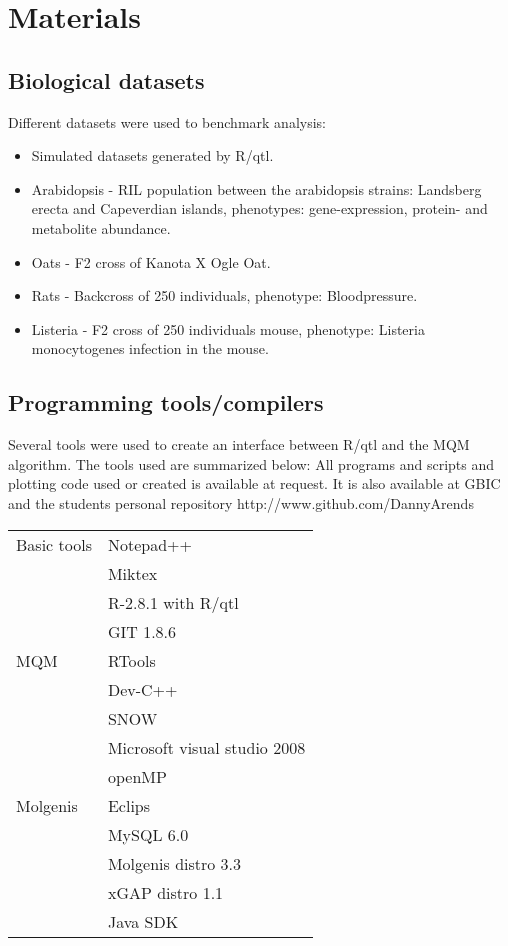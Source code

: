 \newpage
\section{Materials}
\subsection{Biological datasets}
Different datasets were used to benchmark analysis:
\begin{itemize}
\item	Simulated datasets generated by R/qtl. \cite{broman03}
\item	Arabidopsis - RIL population between the arabidopsis strains: Landsberg erecta and Capeverdian islands, phenotypes: gene-expression, protein- and metabolite abundance. \cite{keurtj}
\item	Oats - F2 cross of Kanota X Ogle Oat. \cite{Oats}
\item	Rats - Backcross of 250 individuals, phenotype: Bloodpressure. \cite{Hyper}
\item	Listeria - F2 cross of 250 individuals mouse, phenotype: Listeria monocytogenes infection in the mouse. \cite{Listeria}
\end{itemize}
\subsection{Programming tools/compilers}
Several tools were used to create an interface between R/qtl and the MQM algorithm. The tools used are summarized below:
All programs and scripts and plotting code used or created is available at request. It is also available at GBIC and the students personal repository http://www.github.com/DannyArends
\begin{table}[ht]
	\begin{tabular}{l  l}
Basic tools & Notepad++\\
	& Miktex\\
	& R-2.8.1 with R/qtl\\
	& GIT 1.8.6\\
MQM & RTools\\
	& Dev-C++\\
	& SNOW\\
	& Microsoft visual studio 2008\\
	& openMP\\
Molgenis & Eclips\\	
	& MySQL 6.0\\
	& Molgenis distro 3.3\\
	& xGAP distro 1.1\\
	& Java SDK\\
	\end{tabular}
	\label{tbl:tools}
\end{table}
